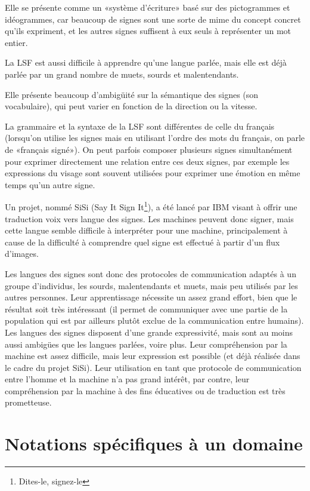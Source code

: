 \documentclass[french,a4paper]{article}
\begin{document}
Elle se présente comme un «système d'écriture» basé sur des
pictogrammes et idéogrammes, car beaucoup de signes sont une sorte de
mime du concept concret qu'ils expriment, et les autres signes
suffisent à eux seuls à représenter un mot entier.

La LSF est aussi difficile à apprendre qu'une langue parlée, mais elle
est déjà parlée par un grand nombre de muets, sourds et malentendants.

Elle présente beaucoup d'ambigüité sur la sémantique des signes (son
vocabulaire), qui peut varier en fonction de la direction ou la
vitesse.

La grammaire et la syntaxe de la LSF sont différentes de celle du
français (lorsqu'on utilise les signes mais en utilisant l'ordre des
mots du français, on parle de «français signé»). On peut parfois
composer plusieurs signes simultanément pour exprimer directement une
relation entre ces deux signes, par exemple les expressions du visage
sont souvent utilisées pour exprimer une émotion en même temps qu'un
autre signe.

Un projet, nommé SiSi (Say It Sign It\footnote{Dites-le, signez-le}),
a été lancé par IBM visant à offrir une traduction voix vers langue
des signes. Les machines peuvent donc signer, mais cette langue semble
difficile à interpréter pour une machine, principalement à cause de la
difficulté à comprendre quel signe est effectué à partir d'un flux
d'images.

Les langues des signes sont donc des protocoles de communication
adaptés à un groupe d'individus, les sourds, malentendants et muets,
mais peu utilisés par les autres personnes. Leur apprentissage
nécessite un assez grand effort, bien que le résultat soit très
intéressant (il permet de communiquer avec une partie de la population
qui est par ailleurs plutôt exclue de la communication entre
humains). Les langues des signes disposent d'une grande expressivité,
mais sont au moins aussi ambigües que les langues parlées, voire
plus. Leur compréhension par la machine est assez difficile, mais leur
expression est possible (et déjà réalisée dans le cadre du projet
SiSi). Leur utilisation en tant que protocole de communication entre
l'homme et la machine n'a pas grand intérêt, par contre, leur
compréhension par la machine à des fins éducatives ou de traduction
est très prometteuse.

\section{Notations spécifiques à un domaine}
\end{document}
